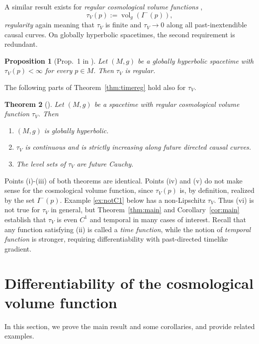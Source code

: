 \documentclass[a4paper,11pt]{amsart}
\newtheorem{theorem}{{Theorem}}[section]
\newtheorem{proposition}[theorem]{{Proposition}}%
\newcommand{\Vol}{\operatorname{vol}_g}
\begin{document}
A similar result exists for \emph{regular cosmological volume functions} \cite[Def.~6.1]{GH23},
\begin{equation*}
    \tau_V(p) := \Vol\left(I^-(p)\right),
\end{equation*}
\emph{regularity} again meaning that $\tau_V$ is finite and $\tau_V \to 0$ along all past-inextendible causal curves. On globally hyperbolic spacetimes, the second requirement is redundant.
\begin{proposition}[Prop.~1 in \cite{GaGa25}] \label{prop:1}
    Let $(M,g)$ be a globally hyperbolic spacetime with $\tau_V(p) < \infty$ for every $p \in M$. Then $\tau_V$ is regular.
\end{proposition}

The following parts of Theorem~\ref{thm:timereg} hold also for $\tau_V$.

\begin{theorem}[{\cite[Thms.~6.3 \& 6.4]{GH23}}]
 Let $(M,g)$ be a spacetime with regular cosmological volume function $\tau_V$. Then
 \begin{enumerate}
 \item $(M,g)$ is globally hyperbolic.
 \item $\tau_V$ is continuous and is strictly increasing along future directed causal curves.
 \item The level sets of $\tau_V$ are future Cauchy.
\end{enumerate}
\end{theorem}

Points (i)-(iii) of both theorems are identical. Points (iv) and (v) do not make sense for the cosmological volume function, since $\tau_V(p)$ is, by definition, realized by the set $I^-(p)$. Example \ref{ex:notC1} below has a non-Lipschitz $\tau_V$. Thus (vi) is not true for $\tau_V$ in general, but Theorem~\ref{thm:main} and Corollary~\ref{cor:main} establish that $\tau_V$ is even $C^1$ and temporal in many cases of interest. Recall that any function satisfying (ii) is called a \emph{time function}, while the notion of \emph{temporal function} is stronger, requiring differentiability with past-directed timelike gradient.

\section{Differentiability of the cosmological volume function}

In this section, we prove the main result and some corollaries, and provide related examples.
\end{document}
